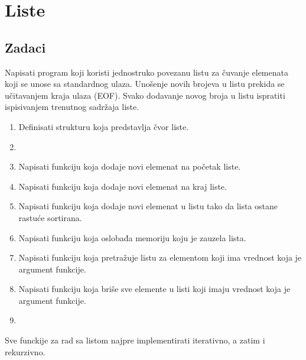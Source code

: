 
\chapter{Liste}

\section{Zadaci}

\begin{Exercise}[label=601]
Napisati program koji koristi jednostruko povezanu listu za čuvanje elemenata koji se unose sa standardnog ulaza. Unošenje novih brojeva u listu prekida se učitavanjem kraja ulaza (EOF). Svako dodavanje novog broja u listu ispratiti ispisivanjem trenutnog sadržaja liste. 
\begin{enumerate}
\item Definisati strukturu  koja predstavlja čvor liste.
\item {}

 \item Napisati funkciju koja dodaje novi elemenat na početak liste.
 \item Napisati funkciju koja dodaje novi elemenat na kraj liste.
 \item {} Napisati funkciju koja dodaje novi elemenat u listu tako da lista ostane rastuće sortirana.
 \item Napisati funkciju koja oslobađa memoriju koju je zauzela lista.
 \item {} Napisati funkciju koja pretražuje listu za elementom koji ima vrednost koja je argument funkcije.
 \item Napisati funkciju koja briše sve elemente u listi koji imaju vrednost koja je argument funkcije.
 \item {}
 \end{enumerate}
Sve funckije za rad sa listom najpre implementirati iterativno, a zatim i rekurzivno.
\end{Exercise}
\begin{Answer}[ref=601]
\end{Answer}

